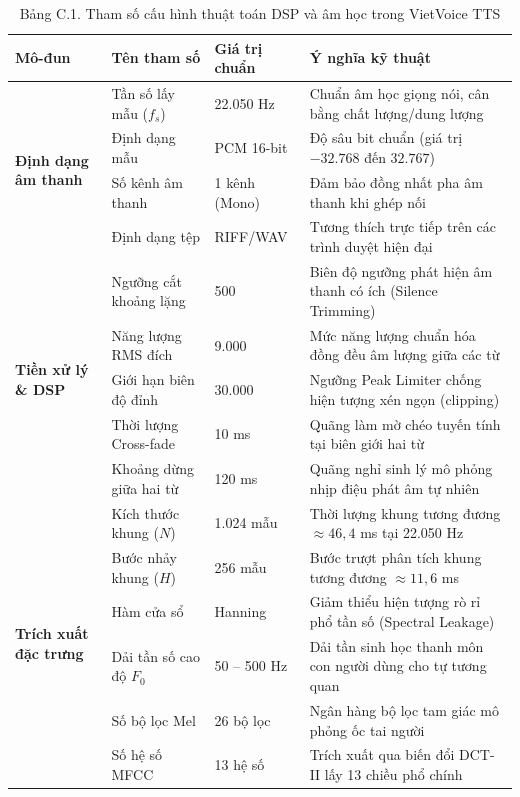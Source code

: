 \begin{table}[H]
\centering
\caption*{Bảng C.1. Tham số cấu hình thuật toán DSP và âm học trong VietVoice TTS}
\vspace{2pt}
\begin{tabularx}{\textwidth}{p{3.2cm}p{3.4cm}p{2.3cm}X}
\toprule
\textbf{Mô-đun} & \textbf{Tên tham số} & \textbf{Giá trị chuẩn} & \textbf{Ý nghĩa kỹ thuật} \\
\midrule
\multirow{4}{*}{\textbf{Định dạng âm thanh}} 
& Tần số lấy mẫu ($f_s$) & 22.050 Hz & Chuẩn âm học giọng nói, cân bằng chất lượng/dung lượng \\
& Định dạng mẫu & PCM 16-bit & Độ sâu bit chuẩn (giá trị $-32.768$ đến $32.767$) \\
& Số kênh âm thanh & 1 kênh (Mono) & Đảm bảo đồng nhất pha âm thanh khi ghép nối \\
& Định dạng tệp & RIFF/WAV & Tương thích trực tiếp trên các trình duyệt hiện đại \\
\midrule
\multirow{5}{*}{\textbf{Tiền xử lý \& DSP}} 
& Ngưỡng cắt khoảng lặng & 500 & Biên độ ngưỡng phát hiện âm thanh có ích (Silence Trimming) \\
& Năng lượng RMS đích & 9.000 & Mức năng lượng chuẩn hóa đồng đều âm lượng giữa các từ \\
& Giới hạn biên độ đỉnh & 30.000 & Ngưỡng Peak Limiter chống hiện tượng xén ngọn (clipping) \\
& Thời lượng Cross-fade & 10 ms & Quãng làm mờ chéo tuyến tính tại biên giới hai từ \\
& Khoảng dừng giữa hai từ & 120 ms & Quãng nghỉ sinh lý mô phỏng nhịp điệu phát âm tự nhiên \\
\midrule
\multirow{6}{*}{\textbf{Trích xuất đặc trưng}} 
& Kích thước khung ($N$) & 1.024 mẫu & Thời lượng khung tương đương $\approx 46{,}4$ ms tại 22.050 Hz \\
& Bước nhảy khung ($H$) & 256 mẫu & Bước trượt phân tích khung tương đương $\approx 11{,}6$ ms \\
& Hàm cửa sổ & Hanning & Giảm thiểu hiện tượng rò rỉ phổ tần số (Spectral Leakage) \\
& Dải tần số cao độ $F_0$ & 50 -- 500 Hz & Dải tần sinh học thanh môn con người dùng cho tự tương quan \\
& Số bộ lọc Mel & 26 bộ lọc & Ngân hàng bộ lọc tam giác mô phỏng ốc tai người \\
& Số hệ số MFCC & 13 hệ số & Trích xuất qua biến đổi DCT-II lấy 13 chiều phổ chính \\
\bottomrule
\end{tabularx}
\end{table}
